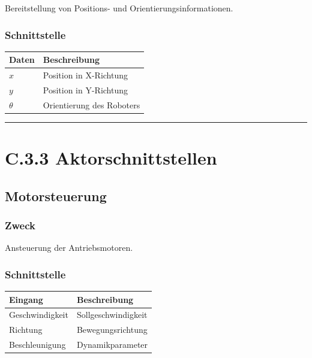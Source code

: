 \documentclass[
  a4paper,
  12pt,
  DIV=12,        %
  parskip=half,  %
  headings=small %
]{scrartcl}
\theoremstyle{definition}
\theoremstyle{definition}
\begin{document}
Bereitstellung von Positions- und Orientierungsinformationen.

\subsubsection{Schnittstelle}\label{schnittstelle-2}

\begin{longtable}[]{@{}ll@{}}
\toprule\noalign{}
Daten & Beschreibung \\
\midrule\noalign{}
\endhead
\bottomrule\noalign{}
\endlastfoot
$x$ & Position in X-Richtung \\
$y$ & Position in Y-Richtung \\
$\theta$ & Orientierung des Roboters \\
\end{longtable}

\begin{center}\rule{0.5\linewidth}{0.5pt}\end{center}

\section{C.3.3 Aktorschnittstellen}\label{c.3.3-aktorschnittstellen}

\subsection{Motorsteuerung}\label{motorsteuerung}

\subsubsection{Zweck}\label{zweck-3}

Ansteuerung der Antriebsmotoren.

\subsubsection{Schnittstelle}\label{schnittstelle-3}

\begin{longtable}[]{@{}ll@{}}
\toprule\noalign{}
Eingang & Beschreibung \\
\midrule\noalign{}
\endhead
\bottomrule\noalign{}
\endlastfoot
Geschwindigkeit & Sollgeschwindigkeit \\
Richtung & Bewegungsrichtung \\
Beschleunigung & Dynamikparameter \\
\end{longtable}
\end{document}
